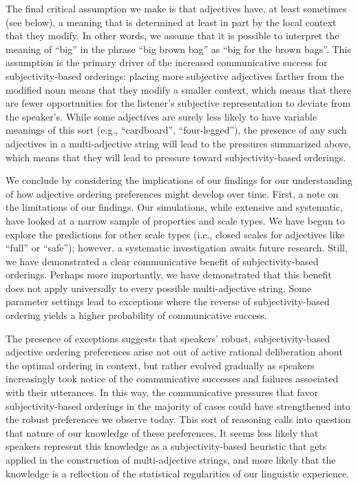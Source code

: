 \documentclass[10pt,a4paper]{article}
\begin{document}
The final critical assumption we make is that adjectives have, at least sometimes (see below), a meaning that is determined at least in part by the local context that they modify. In other words, we assume that it is possible to interpret the meaning of ``big''  in the phrase ``big brown bag'' as ``big for the brown bags''. This assumption is the primary driver of the increased communicative success for subjectivity-based orderings: placing more subjective adjectives farther from the modified noun means that they modify a smaller context, which means that there are fewer opportunities for the listener's subjective representation to deviate from the speaker's. While some adjectives are surely less likely to have variable meanings of this sort (e.g., ``cardboard'', ``four-legged''), the presence of any such adjectives in a multi-adjective string will lead to the pressures summarized above, which means that they will lead to pressure toward subjectivity-based orderings.

We conclude by considering the implications of our findings for our understanding of how adjective ordering preferences might develop over time. First, a note on the limitations of our findings. Our simulations, while extensive and systematic, have looked at a narrow sample of properties and scale types. We have begun to explore the predictions for other scale types (i.e., closed scales for adjectives like ``full'' or ``safe''); however, a systematic investigation awaits future research. Still, we have demonstrated a clear communicative benefit of subjectivity-based orderings. Perhaps more importantly, we have demonstrated that this benefit does not apply universally to every possible multi-adjective string. Some parameter settings lead to exceptions where the reverse of subjectivity-based ordering yields a higher probability of communicative success.

The presence of exceptions suggests that speakers' robust, subjectivity-based adjective ordering preferences arise not out of active rational deliberation about the optimal ordering in context, but rather evolved gradually as speakers increasingly took notice of the communicative successes and failures associated with their utterances. In this way, the communicative pressures that favor subjectivity-based orderings in the majority of cases could have strengthened into the robust preferences we observe today. This sort of reasoning calls into question that nature of our knowledge of these preferences. It seems less likely that speakers represent this knowledge as a subjectivity-based heuristic that gets applied in the construction of multi-adjective strings, and more likely that the knowledge is a reflection of the statistical regularities of our linguistic experience.
\end{document}
